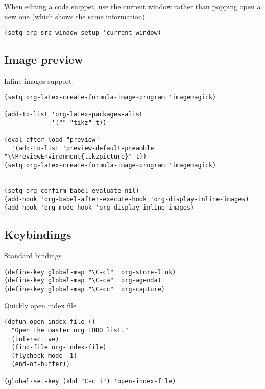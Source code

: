 \documentclass[12pt]{article}
\begin{document}
When editing a code snippet, use the current window rather than popping open a
new one (which shows the same information).
\lstset{language=Lisp,label= ,caption= ,captionpos=b,numbers=none}
\begin{lstlisting}
(setq org-src-window-setup 'current-window)
\end{lstlisting}

\subsection{Image preview}
\label{sec:orga8987a0}

Inline images support:

\lstset{language=Lisp,label= ,caption= ,captionpos=b,numbers=none}
\begin{lstlisting}
(setq org-latex-create-formula-image-program 'imagemagick)

(add-to-list 'org-latex-packages-alist
             '("" "tikz" t))

(eval-after-load "preview"
  '(add-to-list 'preview-default-preamble "\\PreviewEnvironment{tikzpicture}" t))
(setq org-latex-create-formula-image-program 'imagemagick)


(setq org-confirm-babel-evaluate nil)
(add-hook 'org-babel-after-execute-hook 'org-display-inline-images)   
(add-hook 'org-mode-hook 'org-display-inline-images)
\end{lstlisting}

\subsection{Keybindings}
\label{sec:orge67ecf7}


Standard bindings

\lstset{language=Lisp,label= ,caption= ,captionpos=b,numbers=none}
\begin{lstlisting}
(define-key global-map "\C-cl" 'org-store-link)
(define-key global-map "\C-ca" 'org-agenda)
(define-key global-map "\C-cc" 'org-capture)
\end{lstlisting}

Quickly open index file
\lstset{language=Lisp,label= ,caption= ,captionpos=b,numbers=none}
\begin{lstlisting}
(defun open-index-file ()
  "Open the master org TODO list."
  (interactive)
  (find-file org-index-file)
  (flycheck-mode -1)
  (end-of-buffer))

(global-set-key (kbd "C-c i") 'open-index-file)
\end{lstlisting}
\end{document}

